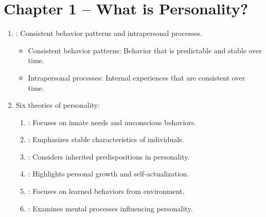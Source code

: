 \section{Chapter 1 -- What is Personality?}

\begin{enumerate}
    \item {}: Consistent behavior patterns and intrapersonal processes.
    \begin{itemize}
        \item Consistent behavior patterns: Behavior that is predictable and stable over time.
        \item Intrapersonal processes: Internal experiences that are consistent over time.
    \end{itemize}
    \item Six theories of personality:
    \begin{enumerate}
        \item {}: Focuses on innate needs and unconscious behaviors.
        \item {}: Emphasizes stable characteristics of individuals.
        \item {}: Considers inherited predispositions in personality.
        \item {}: Highlights personal growth and self-actualization.
        \item {}: Focuses on learned behaviors from environment.
        \item {}: Examines mental processes influencing personality.
    \end{enumerate}
\end{enumerate}